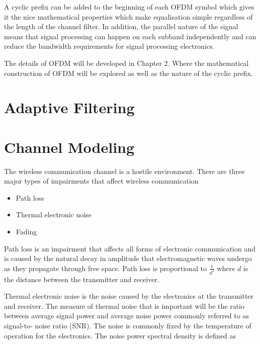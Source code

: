 
A cyclic prefix can be added to the beginning of each OFDM %
symbol which gives it the nice mathematical properties %
which make equalisation simple regardless of the length %
of the channel filter. In addition, the parallel nature %
of the signal means that signal processing can happen %
on each subband independently and can reduce the bandwidth %
requirements for signal processing electronics.

The details of OFDM will be developed in Chapter 2. 
Where the mathematical construction of OFDM will be
explored as well as the nature of the cyclic prefix.

\section{Adaptive Filtering}


\section{Channel Modeling}

The wireless communication channel is a %
hostile environment. There are three %
major types of impairments that affect %
wireless communication

\begin{itemize}
	\item{Path loss}
	\item{Thermal electronic noise}
	\item{Fading}
\end{itemize}

Path loss is an impairment that affects %
all forms of electronic communication and is %
caused by the natural decay in amplitude %
that electromagnetic waves undergo as they %
propagate through free space. Path loss %
is proportional to $\frac{1}{d^2}$ where %
$d$ is the distance between the transmitter %
and receiver.

Thermal electronic noise is the noise %
caused by the electronics at the %
transmitter and receiver. The measure %
of thermal noise that is important %
will be the ratio between average %
signal power and average noise power %
commonly referred to as signal-to-%
noise ratio (SNR). The noise is %
commonly fixed by the temperature %
of operation for the electronics. %
The noise power spectral density %
is defined as %

